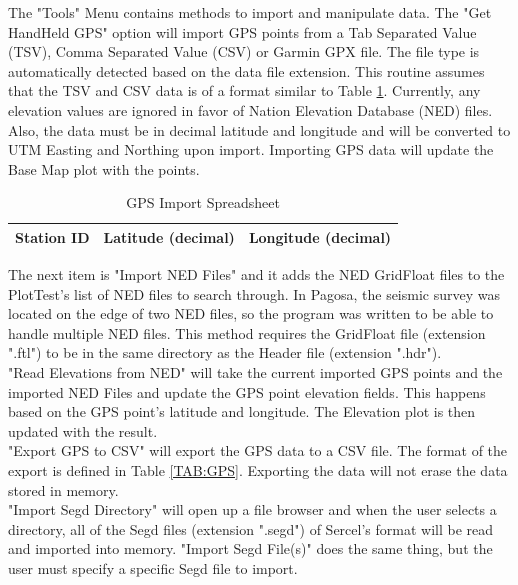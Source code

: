 \documentclass[12pt]{article}
\begin{document}
The "Tools" Menu contains methods to import and manipulate data. The "Get HandHeld GPS" option will import GPS points from a Tab Separated Value (TSV), Comma Separated Value (CSV) or Garmin GPX file. The file type is automatically detected based on the data file extension. This routine assumes that the TSV and CSV data is of a format similar to Table \ref{TAB:GPS2}. Currently, any elevation values are ignored in favor of Nation Elevation Database (NED) files. Also, the data must be in decimal latitude and longitude and will be converted to UTM Easting and Northing upon import. Importing GPS data will update the Base Map plot with the points.\\

\begin{table}[H]
\caption{GPS Import Spreadsheet}
\centering
\begin{tabular}{ c | c | c}
  \hline                  
  Station ID & Latitude (decimal) & Longitude (decimal) \\
  \hline
\end{tabular}
\label{TAB:GPS2}
\end{table}

The next item is "Import NED Files" and it adds the NED GridFloat files to the PlotTest's list of NED files to search through. In Pagosa, the seismic survey was located on the edge of two NED files, so the program was written to be able to handle multiple NED files. This method requires the GridFloat file (extension ".ftl") to be in the same directory as the Header file (extension ".hdr"). \\

"Read Elevations from NED" will take the current imported GPS points and the imported NED Files and update the GPS point elevation fields. This happens based on the GPS point's latitude and longitude. The Elevation plot is then updated with the result. \\

"Export GPS to CSV" will export the GPS data to a CSV file. The format of the export is defined in Table \ref{TAB:GPS}. Exporting the data will not erase the data stored in memory. \\

"Import Segd Directory" will open up a file browser and when the user selects a directory, all of the Segd files (extension ".segd") of Sercel's format will be read and imported into memory. "Import Segd File(s)" does the same thing, but the user must specify a specific Segd file to import. \\
\end{document}
